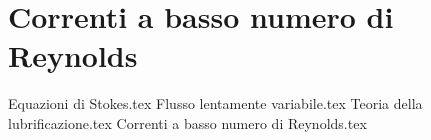 %
\chapter{Correnti a basso numero di Reynolds} 
%
{Equazioni di Stokes.tex}
{Flusso lentamente variabile.tex}
{Teoria della lubrificazione.tex}
{Correnti a basso numero di Reynolds.tex}